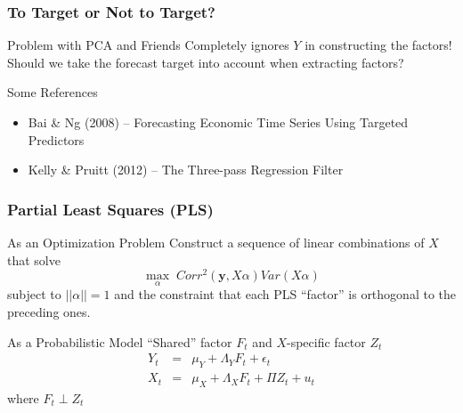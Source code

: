 \documentclass[handout]{beamer}
\begin{document}
\begin{frame}[c]\frametitle{To Target or Not to Target?}
    
    \begin{block}
    	{Problem with PCA and Friends}
    	Completely ignores $Y$ in constructing the factors! Should we take the forecast target into account when extracting factors?
	\end{block}

\begin{block}
	{Some References}
	\begin{itemize}
		\item Bai \& Ng (2008) -- Forecasting Economic Time Series Using Targeted Predictors
		\item Kelly \& Pruitt (2012) -- The Three-pass Regression Filter 
	\end{itemize}
\end{block}

\end{frame}

\begin{frame}[c]\frametitle{Partial Least Squares (PLS)}

\begin{block}
	{As an Optimization Problem}
	Construct a sequence of linear combinations of $X$ that solve
	$$\underset{\alpha}{\max} \; Corr^2(\textbf{y}, X\alpha)Var(X\alpha)$$
subject to $||\alpha ||=1$ and the constraint that each PLS ``factor'' is orthogonal to the preceding ones.
\end{block}

\begin{block}
	{As a Probabilistic Model}
	``Shared'' factor $F_t$ and $X$-specific factor $Z_t$
	\begin{eqnarray*}
		Y_t &=& \mu_Y + \Lambda_Y F_t + \epsilon_t\\
		X_t &=& \mu_X + \Lambda_X F_t + \Pi Z_t + u_t
	\end{eqnarray*}
	where $F_t \perp Z_t$
\end{block}

\end{frame}

\end{document}
